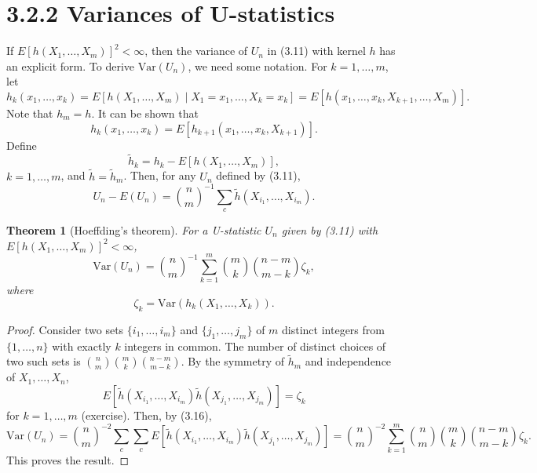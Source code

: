 \documentclass{article}
\newtheorem{theorem}{Theorem}
\begin{document}
\section*{3.2.2 Variances of U-statistics}

If $E[h(X_1,\dots,X_m)]^2 < \infty$, then the variance of $U_n$ in (3.11) with kernel $h$
has an explicit form. To derive $\mathrm{Var}(U_n)$, we need some notation. For $k=1,\dots,m$, let
\[
  h_k(x_1,\dots,x_k) = E[h(X_1,\dots,X_m) \mid X_1=x_1,\dots,X_k=x_k]
                     = E[h(x_1,\dots,x_k,X_{k+1},\dots,X_m)].
\]
Note that $h_m = h$. It can be shown that
\[
  h_k(x_1,\dots,x_k) = E[h_{k+1}(x_1,\dots,x_k,X_{k+1})]. \tag{3.14}
\]
Define
\[
  \tilde{h}_k = h_k - E[h(X_1,\dots,X_m)], \tag{3.15}
\]
$k=1,\dots,m$, and $\tilde{h}=\tilde{h}_m$. Then, for any $U_n$ defined by (3.11),
\[
  U_n - E(U_n) = \binom{n}{m}^{-1} \sum_{c} \tilde{h}(X_{i_1},\dots,X_{i_m}). \tag{3.16}
\]

\begin{theorem}[Hoeffding's theorem]
\label{thm:hoeffding-u-statistic}
For a U-statistic $U_n$ given by (3.11) with $E[h(X_1,\dots,X_m)]^2 < \infty$,
\[
  \mathrm{Var}(U_n) = \binom{n}{m}^{-1} \sum_{k=1}^{m} \binom{m}{k} \binom{n-m}{m-k} \zeta_k,
\]
where
\[
  \zeta_k = \mathrm{Var}(h_k(X_1,\dots,X_k)).
\]
\end{theorem}

\begin{proof}
Consider two sets $\{i_1,\dots,i_m\}$ and $\{j_1,\dots,j_m\}$ of $m$ distinct
integers from $\{1,\dots,n\}$ with exactly $k$ integers in common. The number of
distinct choices of two such sets is $\binom{n}{m}\binom{m}{k}\binom{n-m}{m-k}$.
By the symmetry of $\tilde{h}_m$ and independence of $X_1,\dots,X_n$,
\[
  E[\tilde{h}(X_{i_1},\dots,X_{i_m}) \tilde{h}(X_{j_1},\dots,X_{j_m})] = \zeta_k \tag{3.17}
\]
for $k=1,\dots,m$ (exercise). Then, by (3.16),
\[
  \mathrm{Var}(U_n)
    = \binom{n}{m}^{-2} \sum_c \sum_c E[\tilde{h}(X_{i_1},\dots,X_{i_m}) \tilde{h}(X_{j_1},\dots,X_{j_m})]
    = \binom{n}{m}^{-2} \sum_{k=1}^{m} \binom{n}{m} \binom{m}{k} \binom{n-m}{m-k} \zeta_k.
\]
This proves the result.
\end{proof}
\end{document}
